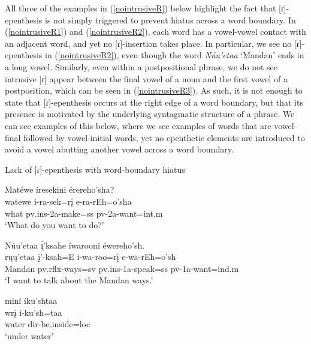 All three of the examples in (\ref{nointrusiveR}) below highlight the fact that [ɾ]-epenthesis is not simply triggered to prevent hiatus across a word boundary. In (\ref{nointrusiveR1}) and (\ref{nointrusiveR2}), each word has a vowel-vowel contact with an adjacent word, and yet no [ɾ]-insertion takes place. In particular, we see no [ɾ]-epenthesis in (\ref{nointrusiveR2}), even though the word \textit{Núu'etaa} `Mandan' ends in a long vowel. Similarly, even within a postpositional phrase, we do not see intrusive [ɾ] appear between the final vowel of a noun and the first vowel of a postposition, which can be seen in (\ref{nointrusiveR3}). As such, it is not enough to state that [ɾ]-epenthesis occurs at the right edge of a word boundary, but that its presence is motivated by the underlying syntagmatic structure of a phrase. We can see examples of this below, where we see examples of words that are vowel-final followed by vowel-initial words, yet no epenthetic elements are introduced to avoid a vowel abutting another vowel across a word boundary.

\begin{exe}
\item\label{nointrusiveR} Lack of [ɾ]-epenthesis with word-boundary hiatus

\begin{xlist}
\item\label{nointrusiveR1}
\glll Matéwe íresekini érereho'sha?\\
	watewe i-ra-sek=rį e-ra-rEh=o'sha\\
	\textnormal{what} pv.ins-2a-\textnormal{make}=ss pv-2a-\textnormal{want}=int.m\\
\glt	`What do you want to do?' \citep[3]{hollow1973b}


\item\label{nointrusiveR2}
\glll	Núu'etaa ı̨́'ksahe íwarooni éwereho'sh.\\
	rųų'etaa į'-ksah=E i-wa-roo=rį e-wa-rEh=o'sh\\
	\textnormal{Mandan} pv.rflx-\textnormal{ways}=sv pv.ins-1a-\textnormal{speak}=ss pv-1a-\textnormal{want}=ind.m\\
\glt	`I want to talk about the Mandan ways.' \citep[47]{hollow1973a}

\item\label{nointrusiveR3}
\glll miní íku'shtaa\\
	wrį i-ku'sh=taa\\
	\textnormal{water} dir-\textnormal{be.inside}=loc\\
\glt	`under water' \citep[10]{hollow1973b}
\end{xlist}
\end{exe}

